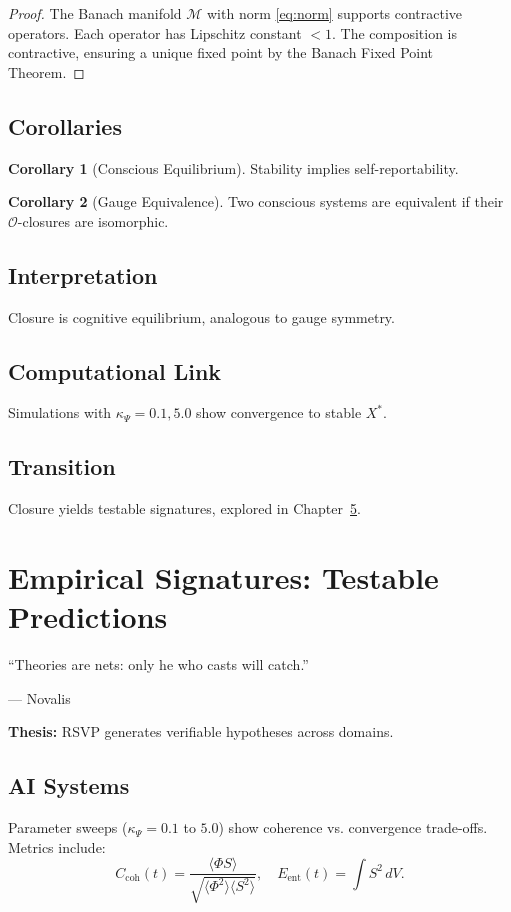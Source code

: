 \documentclass[12pt]{book}
\theoremstyle{definition}
\newtheorem{corollary}{Corollary}[theorem]
\begin{document}
\begin{proof}
The Banach manifold $\mathcal{M}$ with norm \eqref{eq:norm} supports contractive operators. Each operator has Lipschitz constant $<1$. The composition is contractive, ensuring a unique fixed point by the Banach Fixed Point Theorem.
\end{proof}

\section{Corollaries}
\begin{corollary}[Conscious Equilibrium]
Stability implies self-reportability.
\end{corollary}

\begin{corollary}[Gauge Equivalence]
Two conscious systems are equivalent if their $\mathcal{O}$-closures are isomorphic.
\end{corollary}

\section{Interpretation}
Closure is cognitive equilibrium, analogous to gauge symmetry.

\section{Computational Link}
Simulations with $\kappa_\Psi = 0.1, 5.0$ show convergence to stable $X^*$.

\section{Transition}
Closure yields testable signatures, explored in Chapter~\ref{chap:empirical}.

\chapter{Empirical Signatures: Testable Predictions}
\label{chap:empirical}
\epigraph{``Theories are nets: only he who casts will catch.''}{--- Novalis}

\textbf{Thesis:} RSVP generates verifiable hypotheses across domains.

\section{AI Systems}
Parameter sweeps ($\kappa_\Psi = 0.1$ to $5.0$) show coherence vs. convergence trade-offs. Metrics include:
\begin{equation}
C_{\text{coh}}(t) = \frac{\langle \Phi S \rangle}{\sqrt{\langle \Phi^2 \rangle \langle S^2 \rangle}}, \quad E_{\text{ent}}(t) = \int S^2 \, dV.
\end{equation}
\end{document}
